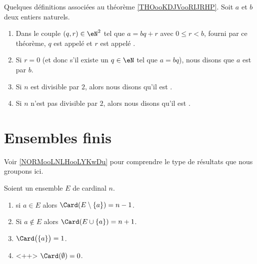 \begin{definition}	\label{DEFooDivisibleNombrePairImpair}
	Quelques définitions associées au théorème \ref{THOooKDJVooRIJRHP}. Soit \( a \) et \( b \) deux entiers naturels.
	\begin{enumerate}
		\item
		      Dans le couple \( (q,r)\in \eN^2\) tel que \( a=bq+r\) avec \( 0\leq r<b\), fourni par ce théorème, \( q \) est appelé  et \( r \) est appelé .
		\item
		      Si \( r=0\) (et donc s'il existe un \( q \in \eN\) tel que \( a = bq \)), nous disons que \( a\) est  par \( b\).
		\item
		      Si \( n\) est divisible par \( 2\), alors nous disons qu'il est .
		\item\label{ITEMooDLHHooTmWSnN}
		      Si \( n\) n'est pas divisible par \( 2\), alors nous disons qu'il est .
	\end{enumerate}
\end{definition}


\section{Ensembles finis}

Voir \ref{NORMooLNLHooLYKwDu} pour comprendre le type de résultats que nous groupons ici.

\begin{lemma}	\label{LEMooKNKEooYQeDdo}
	Soient un ensemble \( E\) de cardinal \( n\).
	\begin{enumerate}
		\item
		      si \( a\in E\) alors \( \Card(E\setminus\{ a \})=n-1\).
		\item		\label{ITEMooLAECooBLOpwZ}
		      Si \( a\not\in E\) alors \( \Card(E\cup\{ a \})=n+1\).
		\item		\label{ITEMooJTFGooKoBzgV}
		      \( \Card\big( \{ a \} \big)=1\).
		\item		\label{ITEMooTCMVooUTOqLw}<++>
		      \( \Card(\emptyset)=0\).
	\end{enumerate}
\end{lemma}


